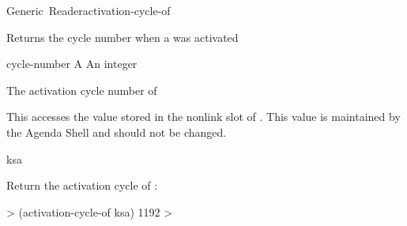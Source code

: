 \documentclass[10pt,twoside,english,pdftex]{article}
\begin{document}
\begin{functiondoc}{Generic~Reader}{activation-cycle-of}{ 
    \returns{} }
%
%

\fnsyntax

\fnpurpose Returns the cycle number when a  was activated

\fnmethods
{}

\fnpackage {}

\fnmodule {}

\fnargs
\begin{args}{cycle-number}
\arg[ksa] A 
 An integer
\end{args}

\fnreturns The activation cycle number of 
  
\fndescription 
This  accesses the value stored in the 
 nonlink slot of .  This value is
maintained by the Agenda Shell and should not be changed.

\begin{alsos}{ksa}
\also[ksa]
\end{alsos}

\fnexample
Return the activation cycle of :
%
\W\supp
\begin{example}
  > (activation-cycle-of ksa)
  1192
  >
\end{example}

\end{functiondoc}

\end{document}
